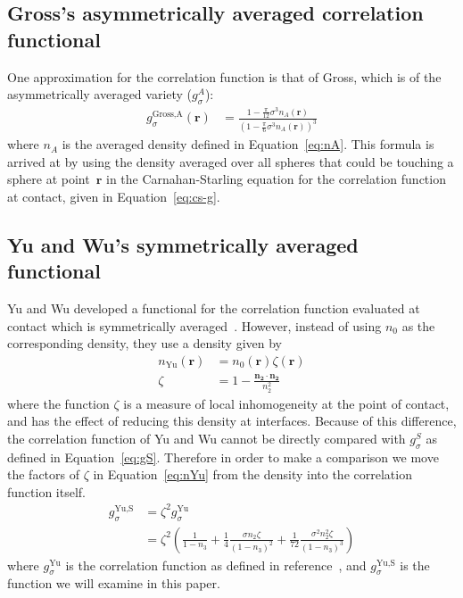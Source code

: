 \documentclass[letterpaper,amsmath,amssymb,10pt,pre]{revtex4-1}
\newcommand{\rr}{\textbf{r}}
\begin{document}
\subsection{Gross's asymmetrically averaged correlation functional}\label{sec:gross}
One approximation for the correlation function is that of
Gross\cite{gross2009density}, which is of the asymmetrically averaged
variety ($g_\sigma^A$):
\begin{align}
  g_\sigma^\text{Gross,A}(\rr) &= \frac{1 - \frac{\pi}{12}\sigma^3n_A(\rr)}{\left(1 -
    \frac{\pi}{6}\sigma^3n_A(\rr)\right)^3}
\end{align}
where $n_A$ is the averaged density defined in Equation~\ref{eq:nA}.
This formula is arrived at by using the density averaged over all
spheres that could be touching a sphere at point~$\rr$ in the
Carnahan-Starling equation for the correlation function at contact,
given in Equation~\ref{eq:cs-g}.

\subsection{Yu and Wu's symmetrically averaged functional}\label{sec:yuwu}

Yu and Wu developed a functional for the correlation function
evaluated at contact which is symmetrically
averaged~\cite{yu2002fmt-dft-inhomogeneous-associating}.  However,
instead of using $n_0$ as the corresponding density, they use a
density given by
\begin{align}
  n_\text{Yu}(\rr) &= n_0(\rr) \zeta(\rr) \label{eq:nYu} \\
  \zeta &= 1 - \frac{\mathbf{n_2}\cdot\mathbf{n_2}}{n_2^2} \label{eq:zeta}
\end{align}
where the function $\zeta$ is a measure of local inhomogeneity at the
point of contact, and has the effect of reducing this density at
interfaces.  Because of this difference, the correlation function of
Yu and Wu cannot be directly compared with $g_\sigma^S$ as defined in
Equation~\ref{eq:gS}.  Therefore in order to make a comparison we move
the factors of $\zeta$ in Equation~\ref{eq:nYu} from the density into
the correlation function itself.
\begin{align}
  g_\sigma^\text{Yu,S} &= \zeta^2 g_\sigma^\text{Yu} \\
   &= \zeta^2\left(\frac{1}{1-n_3}
    + \frac14 \frac{\sigma n_2\zeta}{(1-n_3)^2}
    + \frac1{72} \frac{\sigma^2 n_2^2 \zeta}{(1-n_3)^3}\right)
\end{align}
where $g_\sigma^\text{Yu}$ is the correlation function as defined in
reference~\cite{yu2002fmt-dft-inhomogeneous-associating}, and
$g_\sigma^\text{Yu,S}$ is the function we will examine in this paper.
\end{document}
